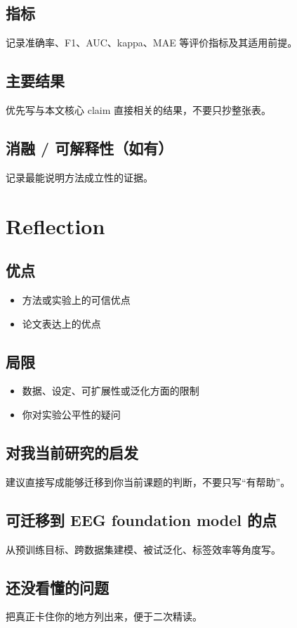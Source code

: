 \documentclass[UTF8,fontset=fandol,zihao=-4]{ctexart}
\begin{document}
\subsection{指标}
记录准确率、F1、AUC、kappa、MAE 等评价指标及其适用前提。

\subsection{主要结果}
优先写与本文核心 claim 直接相关的结果，不要只抄整张表。

\subsection{消融 / 可解释性（如有）}
记录最能说明方法成立性的证据。

\section{Reflection}

\subsection{优点}
\begin{itemize}
  \item 方法或实验上的可信优点
  \item 论文表达上的优点
\end{itemize}

\subsection{局限}
\begin{itemize}
  \item 数据、设定、可扩展性或泛化方面的限制
  \item 你对实验公平性的疑问
\end{itemize}

\subsection{对我当前研究的启发}
建议直接写成能够迁移到你当前课题的判断，不要只写“有帮助”。

\subsection{可迁移到 EEG foundation model 的点}
从预训练目标、跨数据集建模、被试泛化、标签效率等角度写。

\subsection{还没看懂的问题}
把真正卡住你的地方列出来，便于二次精读。
\end{document}
